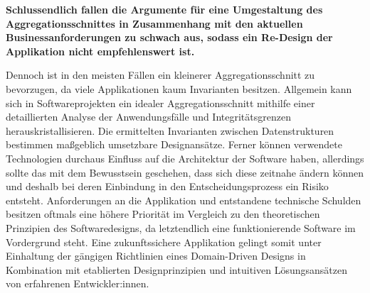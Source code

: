 \textbf{Schlussendlich fallen die Argumente für eine Umgestaltung des Aggregationsschnittes in Zusammenhang mit den aktuellen Businessanforderungen zu schwach aus, sodass ein Re-Design der Applikation nicht empfehlenswert ist.}

Dennoch ist in den meisten Fällen ein kleinerer Aggregationsschnitt zu bevorzugen, da viele Applikationen kaum Invarianten besitzen. Allgemein kann sich in Softwareprojekten ein idealer Aggregationsschnitt mithilfe einer detaillierten Analyse der Anwendungsfälle und Integritätsgrenzen herauskristallisieren. Die ermittelten Invarianten zwischen Datenstrukturen bestimmen maßgeblich umsetzbare Designansätze. Ferner können verwendete Technologien durchaus Einfluss auf die Architektur der Software haben, allerdings sollte das mit dem Bewusstsein geschehen, dass sich diese zeitnahe ändern können und deshalb bei deren Einbindung in den Entscheidungsprozess ein Risiko entsteht. Anforderungen an die Applikation und entstandene \gls{technische Schulden} besitzen oftmals eine höhere Priorität im Vergleich zu den theoretischen Prinzipien des Softwaredesigns, da letztendlich eine funktionierende Software im Vordergrund steht. Eine zukunftssichere Applikation gelingt somit unter Einhaltung der gängigen Richtlinien eines Domain-Driven Designs in Kombination mit etablierten Designprinzipien und intuitiven Lösungsansätzen von erfahrenen Entwickler:innen.  